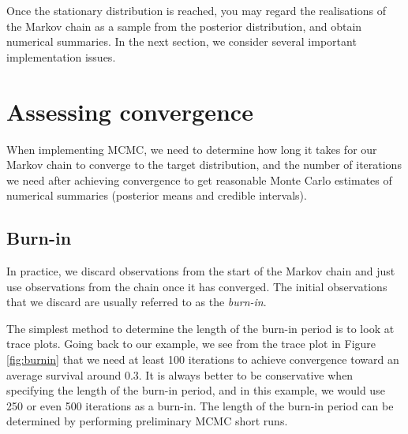 \documentclass[
  12pt,
]{krantz}
\makeatletter
\newenvironment{kframe}{%
\medskip{}
\setlength{\fboxsep}{.8em}
 \def\at@end@of@kframe{}%
 \ifinner\ifhmode%
  \def\at@end@of@kframe{\end{minipage}}%
  \begin{minipage}{\columnwidth}%
 \fi\fi%
 \def\FrameCommand##1{\hskip\@totalleftmargin \hskip-\fboxsep
 \colorbox{shadecolor}{##1}\hskip-\fboxsep
     \hskip-\linewidth \hskip-\@totalleftmargin \hskip\columnwidth}%
 \MakeFramed {\advance\hsize-\width
   \@totalleftmargin\z@ \linewidth\hsize
   \@setminipage}}%
 {\par\unskip\endMakeFramed%
 \at@end@of@kframe}
\newenvironment{rmdblock}[1]
  {
  \begin{itemize}
  \renewcommand{\labelitemi}{
    \raisebox{-.7\height}[0pt][0pt]{
      {\setkeys{Gin}{width=3em,keepaspectratio}\texttt{[image: images/\#1]}}
    }
  }
  \setlength{\fboxsep}{1em}
  \begin{kframe}
  \item
  }
  {
  \end{kframe}
  \end{itemize}
  }
\newenvironment{rmdnote}
  {\begin{rmdblock}{note}}
  {\end{rmdblock}}
\makeatother
\begin{document}
Once the stationary distribution is reached, you may regard the realisations of the Markov chain as a sample from the posterior distribution, and obtain numerical summaries. In the next section, we consider several important implementation issues.

\hypertarget{convergence-diag}{%
\section{Assessing convergence}\label{convergence-diag}}

\begin{rmdnote}
When implementing MCMC, we need to determine how long it takes for our Markov chain to converge to the target distribution, and the number of iterations we need after achieving convergence to get reasonable Monte Carlo estimates of numerical summaries (posterior means and credible intervals).
\end{rmdnote}

\hypertarget{burn-in}{%
\subsection{Burn-in}\label{burn-in}}

In practice, we discard observations from the start of the Markov chain and just use observations from the chain once it has converged. The initial observations that we discard are usually referred to as the \emph{burn-in}.

The simplest method to determine the length of the burn-in period is to look at trace plots. Going back to our example, we see from the trace plot in Figure \ref{fig:burnin} that we need at least 100 iterations to achieve convergence toward an average survival around 0.3. It is always better to be conservative when specifying the length of the burn-in period, and in this example, we would use 250 or even 500 iterations as a burn-in. The length of the burn-in period can be determined by performing preliminary MCMC short runs.
\end{document}
